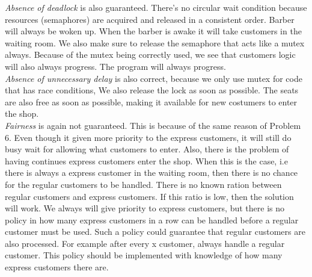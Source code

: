 \textit{Absence of deadlock} is also guaranteed. 
There's no circular wait condition because resources (semaphores) are acquired and released in a consistent order. 
Barber will always be woken up. When the barber is awake it will take customers in the waiting room. 
We also make sure to release the semaphore that acts like a mutex always. Because of the mutex being correctly used, we see that customers logic will also always progress.
The program will always progress. \\

\textit{Absence of unnecessary delay} is also correct, because we only use mutex for code that has race conditions, We also release the lock as soon as possible. 
The seats are also free as soon as possible, making it available for new costumers to enter the shop. \\

\textit{Fairness} is again not guaranteed. This is because of the same reason of Problem 6. 
Even though it given more priority to the express customers, it will still do busy wait for allowing what customers to enter. 
Also, there is the problem of having continues express customers enter the shop. When this is the case, i.e there is always a express customer in the waiting room, then there is no chance for the regular customers to be handled. 
There is no known ration between regular customers and express customers. If this ratio is low, then the solution will work. We always will give priority to express customers, but there is no policy in how many express customers in a row can be handled before a regular customer must be used. 
Such a policy could guarantee that regular customers are also processed. For example after every x customer, always handle a regular customer. This policy should be implemented with knowledge of how many express customers there are.  

